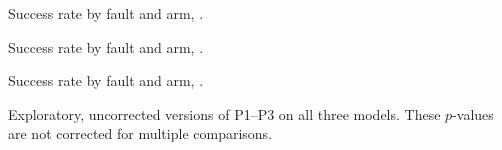 \documentclass[10pt]{article}
\begin{document}
\begin{table}[h]\centering\small
\resizebox{\textwidth}{!}{}
\caption{Success rate by fault and arm, \RQwenEightModel{}.}\label{tab:full-qwen8}
\end{table}
\begin{table}[h]\centering\small
\resizebox{\textwidth}{!}{}
\caption{Success rate by fault and arm, \RQwenFourModel{}.}\label{tab:full-qwen4}
\end{table}
\begin{table}[h]\centering\small
\resizebox{\textwidth}{!}{}
\caption{Success rate by fault and arm, \RHaikuModel{}.}\label{tab:full-haiku}
\end{table}
\begin{table}[h]\centering\small

\caption{Exploratory, uncorrected versions of P1--P3 on all three models. These $p$-values are not
corrected for multiple comparisons.}\label{tab:exploratory}
\end{table}
\end{document}
